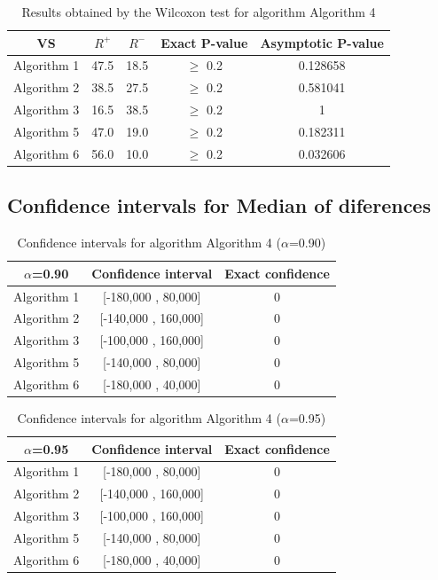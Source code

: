 \documentclass[a4paper,10pt]{article}
\begin{document}
\begin{table}[!htp]
\centering\small
\begin{tabular}{
|c|c|c|c|c|}
\hline
 VS & $R^{+}$ & $R^{-}$ & Exact P-value & Asymptotic P-value \\ \hline 
Algorithm 1 & 47.5 & 18.5 & $\geq$ 0.2 & 0.128658\\ \hline 
Algorithm 2 & 38.5 & 27.5 & $\geq$ 0.2 & 0.581041\\ \hline 
Algorithm 3 & 16.5 & 38.5 & $\geq$ 0.2 & 1\\ \hline 
Algorithm 5 & 47.0 & 19.0 & $\geq$ 0.2 & 0.182311\\ \hline 
Algorithm 6 & 56.0 & 10.0 & $\geq$ 0.2 & 0.032606\\ \hline 

\end{tabular}
\caption{Results obtained by the Wilcoxon test for algorithm Algorithm 4}
\end{table}

\subsection{Confidence intervals for Median of diferences}

\begin{table}[!htp]
\centering\small
\begin{tabular}{
|c|c|c|}
\hline
 $\alpha$=0.90 & Confidence interval & Exact confidence \\ \hline 
Algorithm 1 & [-180,000 , 80,000] & 0\\ \hline 
Algorithm 2 & [-140,000 , 160,000] & 0\\ \hline 
Algorithm 3 & [-100,000 , 160,000] & 0\\ \hline 
Algorithm 5 & [-140,000 , 80,000] & 0\\ \hline 
Algorithm 6 & [-180,000 , 40,000] & 0\\ \hline 

\end{tabular}
\caption{Confidence intervals for algorithm Algorithm 4 ($\alpha$=0.90)}
\end{table}
\begin{table}[!htp]
\centering\small
\begin{tabular}{
|c|c|c|}
\hline
 $\alpha$=0.95 & Confidence interval & Exact confidence \\ \hline 
Algorithm 1 & [-180,000 , 80,000] & 0\\ \hline 
Algorithm 2 & [-140,000 , 160,000] & 0\\ \hline 
Algorithm 3 & [-100,000 , 160,000] & 0\\ \hline 
Algorithm 5 & [-140,000 , 80,000] & 0\\ \hline 
Algorithm 6 & [-180,000 , 40,000] & 0\\ \hline 

\end{tabular}
\caption{Confidence intervals for algorithm Algorithm 4 ($\alpha$=0.95)}
\end{table}
\end{document}
